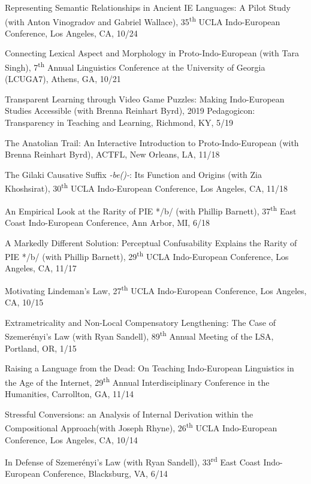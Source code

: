 \documentclass[paper=letter,fontsize=11pt]{scrartcl}
\newcommand{\TalkEntry}[4]{
		\noindent #1, #2, #3 #4}
\begin{document}
\begin{etaremune}
\item\TalkEntry{Representing Semantic Relationships in Ancient IE Languages: A Pilot Study (with Anton Vinogradov and Gabriel Wallace)}{35\textsuperscript{th} UCLA Indo-European Conference, Los Angeles, CA}{10/24}
\item\TalkEntry{Connecting Lexical Aspect and Morphology in Proto-Indo-European (with Tara Singh)}{7\textsuperscript{th} Annual Linguistics Conference at the University of Georgia (LCUGA7), Athens, GA}{10/21}
\item\TalkEntry{Transparent Learning through Video Game Puzzles: Making Indo-European Studies Accessible (with Brenna Reinhart Byrd)}{2019 Pedagogicon: Transparency in Teaching and Learning, Richmond, KY}{5/19}
\item\TalkEntry{The Anatolian Trail: An Interactive Introduction to Proto-Indo-European (with Brenna Reinhart Byrd)}{ACTFL, New Orleans, LA}{11/18}
\item\TalkEntry{The Gilaki Causative Suffix \textit{-be(\textlengthmark)-}: Its Function and Origins (with Zia Khoshsirat)}{30\textsuperscript{th} UCLA Indo-European Conference, Los Angeles, CA}{11/18}
\item\TalkEntry{An Empirical Look at the Rarity of PIE */b/ (with Phillip Barnett)}{37\textsuperscript{th} East Coast Indo-European Conference, Ann Arbor, MI}{6/18}
\item\TalkEntry{A Markedly Different Solution: Perceptual Confusability Explains the Rarity of PIE */b/ (with Phillip Barnett)}{29\textsuperscript{th} UCLA Indo-European Conference, Los Angeles, CA}{11/17}
\item\TalkEntry{Motivating Lindeman’s Law}{27\textsuperscript{th} UCLA Indo-European Conference, Los Angeles, CA}{10/15}
\item\TalkEntry{Extrametricality and Non-Local Compensatory Lengthening: The Case of Szemerényi’s Law (with Ryan Sandell)}{89\textsuperscript{th} Annual Meeting of the LSA, Portland, OR}{1/15}
\item\TalkEntry{Raising a Language from the Dead: On Teaching Indo-European Linguistics in the Age of the Internet}{29\textsuperscript{th} Annual Interdisciplinary Conference in the Humanities, Carrollton, GA}{11/14}
\item\TalkEntry{Stressful Conversions: an Analysis of Internal Derivation within the Compositional Approach(with Joseph Rhyne)}{26\textsuperscript{th} UCLA Indo-European Conference, Los Angeles, CA}{10/14}
\item\TalkEntry{In Defense of Szemerényi’s Law (with Ryan Sandell)}{33\textsuperscript{rd} East Coast Indo-European Conference, Blacksburg, VA}{6/14}

\end{etaremune}
\end{document}
